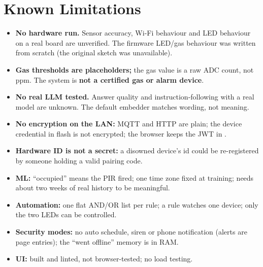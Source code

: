 \documentclass[11pt,a4paper]{article}
\newcommand{\code}[1]{\texttt{\detokenize{#1}}}
\begin{document}
\section{Known Limitations}
\begin{itemize}
  \item \textbf{No hardware run.} Sensor accuracy, Wi-Fi behaviour and LED behaviour on a real board are unverified. The firmware LED/gas behaviour was written from scratch (the original sketch was unavailable).
  \item \textbf{Gas thresholds are placeholders;} the gas value is a raw ADC count, not ppm. The system is \textbf{not a certified gas or alarm device}.
  \item \textbf{No real LLM tested.} Answer quality and instruction-following with a real model are unknown. The default embedder matches wording, not meaning.
  \item \textbf{No encryption on the LAN:} MQTT and HTTP are plain; the device credential in flash is not encrypted; the browser keeps the JWT in \code{localStorage}.
  \item \textbf{Hardware ID is not a secret:} a disowned device's id could be re-registered by someone holding a valid pairing code.
  \item \textbf{ML:} ``occupied'' means the PIR fired; one time zone fixed at training; needs about two weeks of real history to be meaningful.
  \item \textbf{Automation:} one flat AND/OR list per rule; a rule watches one device; only the two LEDs can be controlled.
  \item \textbf{Security modes:} no auto schedule, siren or phone notification (alerts are page entries); the ``went offline'' memory is in RAM.
  \item \textbf{UI:} built and linted, not browser-tested; no load testing.
\end{itemize}

\end{document}
